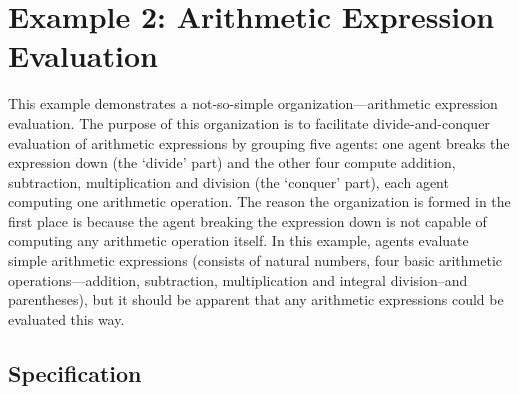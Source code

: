 
\section{Example 2: Arithmetic Expression Evaluation}

This example demonstrates a not-so-simple organization---arithmetic expression evaluation.
The purpose of this organization is to facilitate divide-and-conquer evaluation of arithmetic expressions by grouping five agents: one agent breaks the expression down (the `divide' part) and the other four compute addition, subtraction, multiplication and division (the `conquer' part), each agent computing one arithmetic operation.
The reason the organization is formed in the first place is because the agent breaking the expression down is not capable of computing any arithmetic operation itself.
In this example, agents evaluate simple arithmetic expressions (consists of natural numbers, four basic arithmetic operations---addition, subtraction, multiplication and integral division--and parentheses), but it should be apparent that any arithmetic expressions could be evaluated this way.

\subsection*{Specification}


